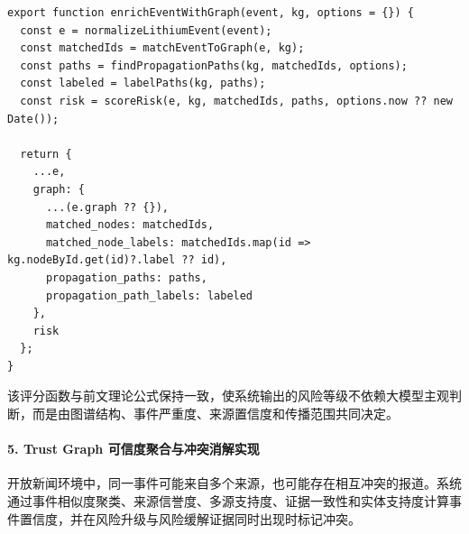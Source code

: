 ﻿\documentclass[12pt,a4paper]{article}
\begin{document}
\begin{lstlisting}[style=projectcode,caption={图增强可解释风险评分实现}]
export function enrichEventWithGraph(event, kg, options = {}) {
  const e = normalizeLithiumEvent(event);
  const matchedIds = matchEventToGraph(e, kg);
  const paths = findPropagationPaths(kg, matchedIds, options);
  const labeled = labelPaths(kg, paths);
  const risk = scoreRisk(e, kg, matchedIds, paths, options.now ?? new Date());

  return {
    ...e,
    graph: {
      ...(e.graph ?? {}),
      matched_nodes: matchedIds,
      matched_node_labels: matchedIds.map(id => kg.nodeById.get(id)?.label ?? id),
      propagation_paths: paths,
      propagation_path_labels: labeled
    },
    risk
  };
}
\end{lstlisting}

该评分函数与前文理论公式保持一致，使系统输出的风险等级不依赖大模型主观判断，而是由图谱结构、事件严重度、来源置信度和传播范围共同决定。

\paragraph{5. Trust Graph 可信度聚合与冲突消解实现}

开放新闻环境中，同一事件可能来自多个来源，也可能存在相互冲突的报道。系统通过事件相似度聚类、来源信誉度、多源支持度、证据一致性和实体支持度计算事件置信度，并在风险升级与风险缓解证据同时出现时标记冲突。
\end{document}
